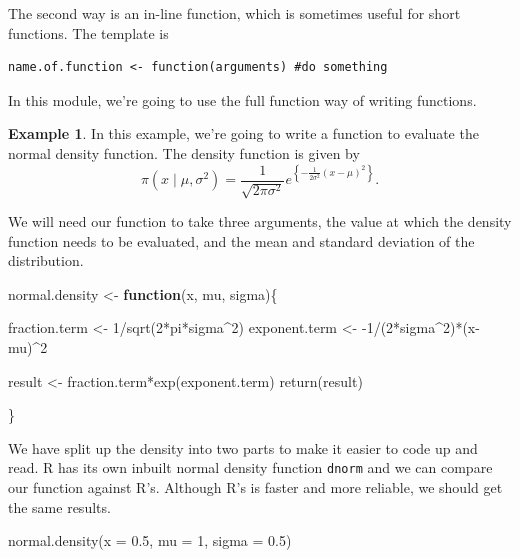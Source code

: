 \documentclass[
]{book}
\newenvironment{Shaded}{\begin{snugshade}}{\end{snugshade}}
\newcommand{\AttributeTok}[1]{\textcolor[rgb]{0.77,0.63,0.00}{#1}}
\newcommand{\ControlFlowTok}[1]{\textcolor[rgb]{0.13,0.29,0.53}{\textbf{#1}}}
\newcommand{\DecValTok}[1]{\textcolor[rgb]{0.00,0.00,0.81}{#1}}
\newcommand{\FloatTok}[1]{\textcolor[rgb]{0.00,0.00,0.81}{#1}}
\newcommand{\FunctionTok}[1]{\textcolor[rgb]{0.00,0.00,0.00}{#1}}
\newcommand{\NormalTok}[1]{#1}
\newcommand{\OtherTok}[1]{\textcolor[rgb]{0.56,0.35,0.01}{#1}}
\newcommand{\SpecialCharTok}[1]{\textcolor[rgb]{0.00,0.00,0.00}{#1}}
\theoremstyle{definition}
\theoremstyle{definition}
\newtheorem{example}{Example}[chapter]
\theoremstyle{definition}
\theoremstyle{definition}
\theoremstyle{remark}
\begin{document}
The second way is an in-line function, which is sometimes useful for short functions. The template is

\begin{verbatim}
name.of.function <- function(arguments) #do something
\end{verbatim}

In this module, we're going to use the full function way of writing functions.

\begin{example}
In this example, we're going to write a function to evaluate the normal density function. The density function is given by
\[
\pi(x \mid \mu, \sigma^2) = \frac{1}{\sqrt{2\pi\sigma^2}}e^{\left\{-\frac{1}{2\sigma^2}(x-\mu)^2\right\}}.
\]

We will need our function to take three arguments, the value at which the density function needs to be evaluated, and the mean and standard deviation of the distribution.

\begin{Shaded}
\begin{Highlighting}[]
\NormalTok{normal.density }\OtherTok{\textless{}{-}} \ControlFlowTok{function}\NormalTok{(x, mu, sigma)\{}
  
\NormalTok{  fraction.term }\OtherTok{\textless{}{-}} \DecValTok{1}\SpecialCharTok{/}\FunctionTok{sqrt}\NormalTok{(}\DecValTok{2}\SpecialCharTok{*}\NormalTok{pi}\SpecialCharTok{*}\NormalTok{sigma}\SpecialCharTok{\^{}}\DecValTok{2}\NormalTok{)}
\NormalTok{  exponent.term }\OtherTok{\textless{}{-}} \SpecialCharTok{{-}}\DecValTok{1}\SpecialCharTok{/}\NormalTok{(}\DecValTok{2}\SpecialCharTok{*}\NormalTok{sigma}\SpecialCharTok{\^{}}\DecValTok{2}\NormalTok{)}\SpecialCharTok{*}\NormalTok{(x}\SpecialCharTok{{-}}\NormalTok{mu)}\SpecialCharTok{\^{}}\DecValTok{2}
  
\NormalTok{  result }\OtherTok{\textless{}{-}}\NormalTok{ fraction.term}\SpecialCharTok{*}\FunctionTok{exp}\NormalTok{(exponent.term)}
  \FunctionTok{return}\NormalTok{(result)}
  
\NormalTok{\}}
\end{Highlighting}
\end{Shaded}

We have split up the density into two parts to make it easier to code up and read. R has its own inbuilt normal density function \texttt{dnorm} and we can compare our function against R's. Although R's is faster and more reliable, we should get the same results.

\begin{Shaded}
\begin{Highlighting}[]
\FunctionTok{normal.density}\NormalTok{(}\AttributeTok{x =} \FloatTok{0.5}\NormalTok{, }\AttributeTok{mu =} \DecValTok{1}\NormalTok{, }\AttributeTok{sigma =} \FloatTok{0.5}\NormalTok{)}
\end{Highlighting}
\end{Shaded}


\end{example}
\end{document}
